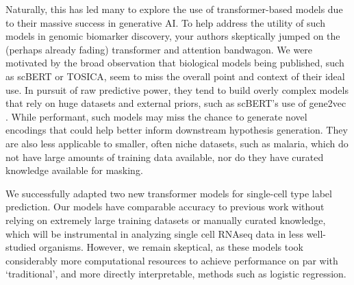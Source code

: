\documentclass{article}
\begin{document}
Naturally, this has led many to explore the use of transformer-based models due to their massive success in generative AI. To help address the utility of such models in genomic biomarker discovery, your authors skeptically jumped on the (perhaps already fading) transformer and attention bandwagon. We were motivated by the broad observation that biological models being published, such as scBERT or TOSICA, seem to miss the overall point and context of their ideal use. In pursuit of raw predictive power, they tend to build overly complex models that rely on huge datasets and external priors, such as scBERT’s use of gene2vec \cite{duGene2vecDistributedRepresentation2019}. While performant, such models may miss the chance to generate novel encodings that could help better inform downstream hypothesis generation. They are also less applicable to smaller, often niche datasets, such as malaria, which do not have large amounts of training data available, nor do they have curated knowledge available for masking.

We successfully adapted two new transformer models for single-cell type label prediction. Our models have comparable accuracy to previous work without relying on extremely large training datasets or manually curated knowledge, which will be instrumental in analyzing single cell RNAseq data in less well-studied organisms. However, we remain skeptical, as these models took considerably more computational resources to achieve performance on par with ‘traditional’, and more directly interpretable, methods such as logistic regression.




\end{document}
